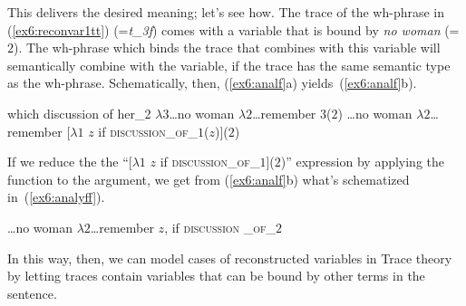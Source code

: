 \vspace*{-30pt}
This delivers the desired meaning; let's see how. The trace of the wh-phrase in (\ref{ex6:reconvar1tt}) (=\emph{t_{3f}}) comes with a variable that is bound by \emph{no woman} (=$2$). The wh-phrase which binds the trace that combines with this variable will semantically combine with the variable, if the trace has the same semantic type as the wh-phrase. Schematically, then, (\ref{ex6:analf}a) yields~(\ref{ex6:analf}b).
\begin{exe}
\raggedright
	\ex \label{ex6:analf}
	\begin{xlist}
		\ex which discussion of her_2 $\lambda 3$\ldots no woman $\lambda 2$\ldots remember $3$($2$)
		\ex \ldots no woman $\lambda 2$\ldots remember [$\lambda 1$ $z$ if \textsc{discussion\_of}\_$1$($z$)]($2$)
	\end{xlist}
\end{exe}
If we reduce the the ``[$\lambda 1$ $z$ if \textsc{discussion\_of}\_$1$]($2$)'' expression by applying the function to the argument, we get from (\ref{ex6:analf}b) what's schematized in~(\ref{ex6:analyff}).
\begin{exe}
\raggedright
	\ex \label{ex6:analyff}
	\ldots no woman $\lambda 2$\ldots remember $z$, if \textsc{discussion
	_of}\_$2$
\end{exe}
In this way, then, we can model cases of reconstructed variables in Trace theory by letting traces contain variables that can be bound by other terms in the sentence.

